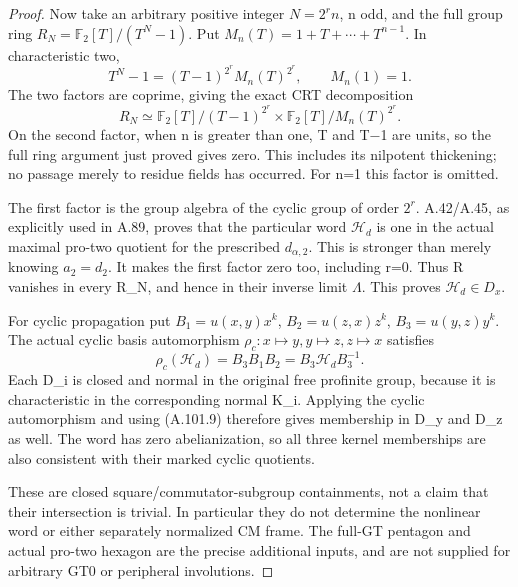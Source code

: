 \begin{proof}
Now take an arbitrary positive integer \(N=2^r n\), n odd, and
the full group ring \(R_N=\mathbb F_2[T]/(T^N-1)\). Put
\(M_n(T)=1+T+\cdots+T^{n-1}\). In characteristic two,
\[
 T^N-1=(T-1)^{2^r}M_n(T)^{2^r},\qquad M_n(1)=1.
 \tag{A.101.7}
\]
The two factors are coprime, giving the exact CRT decomposition
\[
 R_N\simeq\mathbb F_2[T]/(T-1)^{2^r}
       \times\mathbb F_2[T]/M_n(T)^{2^r}.
 \tag{A.101.8}
\]
On the second factor, when n is greater than one, T and T−1 are
units, so the full ring argument just proved gives zero. This
includes its nilpotent thickening; no passage merely to residue
fields has occurred. For n=1 this factor is omitted.

The first factor is the group algebra of the cyclic group of order
\(2^r\). A.42/A.45, as explicitly used in A.89, proves that the
particular word \(\mathcal H_d\) is one in the actual maximal
pro-two quotient for the prescribed \(d_{\alpha,2}\). This is
stronger than merely knowing \(a_2=d_2\). It makes the first
factor zero too, including r=0. Thus R vanishes in every R_N,
and hence in their inverse limit \(\Lambda\). This proves
\(\mathcal H_d\in D_x\).

For cyclic propagation put
\(B_1=u(x,y)x^k\), \(B_2=u(z,x)z^k\),
\(B_3=u(y,z)y^k\). The actual cyclic basis automorphism
\(\rho_c:x\mapsto y,y\mapsto z,z\mapsto x\) satisfies
\[
 \rho_c(\mathcal H_d)=B_3B_1B_2
                       =B_3\mathcal H_dB_3^{-1}.
 \tag{A.101.9}
\]
Each D_i is closed and normal in the original free profinite group,
because it is characteristic in the corresponding normal K_i.
Applying the cyclic automorphism and using (A.101.9) therefore
gives membership in D_y and D_z as well. The word has zero
abelianization, so all three kernel memberships are also consistent
with their marked cyclic quotients.

These are closed square/commutator-subgroup containments, not a
claim that their intersection is trivial. In particular they do
not determine the nonlinear word or either separately normalized
CM frame. The full-GT pentagon and actual pro-two hexagon are the
precise additional inputs, and are not supplied for arbitrary GT0
or peripheral involutions.
\end{proof}
